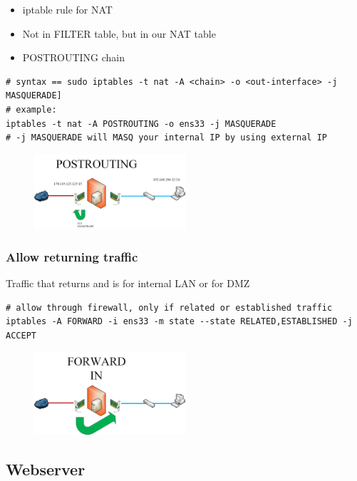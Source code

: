 \documentclass{article}
\begin{document}
\begin{itemize}
    \item iptable rule for NAT
    \item Not in FILTER table, but in our NAT table
    \item POSTROUTING chain
\end{itemize}

\begin{verbatim}
# syntax == sudo iptables -t nat -A <chain> -o <out-interface> -j MASQUERADE]
# example:
iptables -t nat -A POSTROUTING -o ens33 -j MASQUERADE
# -j MASQUERADE will MASQ your internal IP by using external IP
\end{verbatim}

\begin{figure}[H]
    \centering
    \includegraphics[width=0.5\textwidth]{postrouting-chain.jpg}
\end{figure}

\subsubsection{Allow returning traffic}

Traffic that returns and is for internal LAN or for DMZ

\begin{verbatim}
# allow through firewall, only if related or established traffic
iptables -A FORWARD -i ens33 -m state --state RELATED,ESTABLISHED -j ACCEPT
\end{verbatim}

\begin{figure}[H]
    \centering
    \includegraphics[width=0.5\textwidth]{forward-in-chain.jpg}
\end{figure}

\subsection{Webserver}
\end{document}
